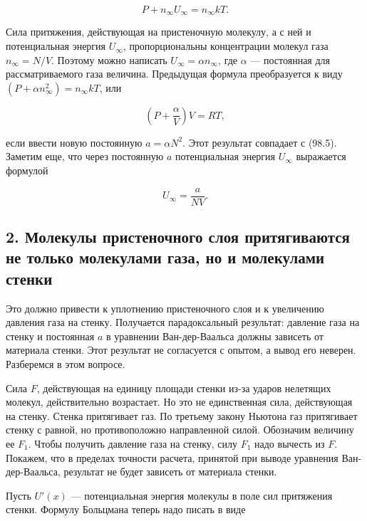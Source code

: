 \documentclass[12pt]{article} %
\begin{document}
\begin{equation}
P + n_\infty U_\infty = n_\infty kT. \tag{99.3}
\end{equation}

Сила притяжения, действующая на пристеночную молекулу, а с ней и потенциальная энергия $U_\infty$, пропорциональны концентрации молекул газа $n_\infty = N/V$. Поэтому можно написать $U_\infty = \alpha n_\infty$, где $\alpha$ — постоянная для рассматриваемого газа величина. Предыдущая формула преобразуется к виду $(P + \alpha n_\infty^2) = n_\infty kT$, или

\begin{equation}
\left(P + \frac{\alpha}{V}\right)V = RT, \tag{99.4}
\end{equation}

если ввести новую постоянную $a = \alpha N^2$. Этот результат совпадает с (98.5). Заметим еще, что через постоянную $a$ потенциальная энергия $U_\infty$ выражается формулой

\begin{equation}
U_\infty = \frac{a}{NV}. \tag{99.5}
\end{equation}

\subsection*{2. Молекулы пристеночного слоя притягиваются не только молекулами газа, но и молекулами стенки}

Это должно привести к уплотнению пристеночного слоя и к увеличению давления газа на стенку. Получается парадоксальный результат: давление газа на стенку и постоянная $a$ в уравнении Ван-дер-Ваальса должны зависеть от материала стенки. Этот результат не согласуется с опытом, а вывод его неверен. Разберемся в этом вопросе.

Сила $F$, действующая на единицу площади стенки из-за ударов нелетящих молекул, действительно возрастает. Но это не единственная сила, действующая на стенку. Стенка притягивает газ. По третьему закону Ньютона газ притягивает стенку с равной, но противоположно направленной силой. Обозначим величину ее $F_1$. Чтобы получить давление газа на стенку, силу $F_1$ надо вычесть из $F$. Покажем, что в пределах точности расчета, принятой при выводе уравнения Ван-дер-Ваальса, результат не будет зависеть от материала стенки.

Пусть $U'(x)$ — потенциальная энергия молекулы в поле сил притяжения стенки. Формулу Больцмана теперь надо писать в виде
\end{document}
